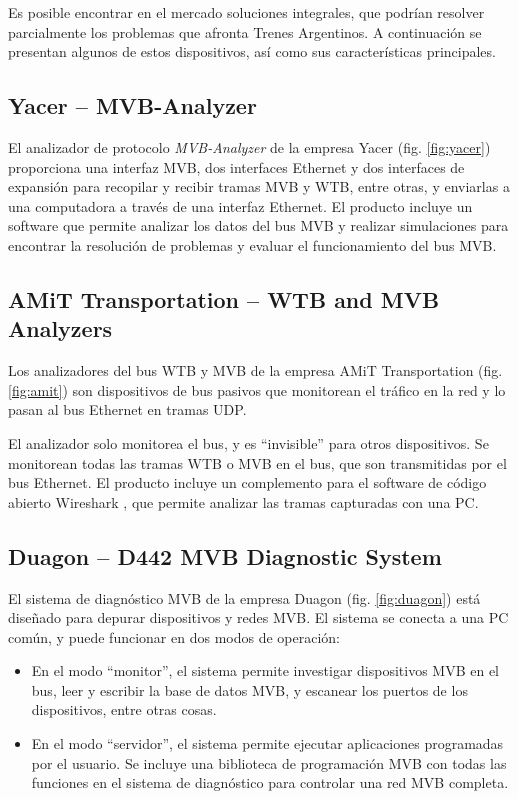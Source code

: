 Es posible encontrar en el mercado soluciones integrales, que podrían resolver parcialmente los problemas que afronta Trenes Argentinos. A continuación se presentan algunos de estos dispositivos, así como sus características principales.

\subsection{Yacer -- MVB-Analyzer}

El analizador de protocolo \textit{MVB-Analyzer} de la empresa Yacer \cite{yacer} (fig. \ref{fig:yacer}) proporciona una interfaz MVB, dos interfaces Ethernet y dos interfaces de expansión para recopilar y recibir tramas MVB y WTB, entre otras, y enviarlas a una computadora a través de una interfaz Ethernet. El producto incluye un software que permite analizar los datos del bus MVB y realizar simulaciones para encontrar la resolución de problemas y evaluar el funcionamiento del bus MVB.

\subsection{AMiT Transportation -- WTB and MVB Analyzers}

Los analizadores del bus WTB y MVB de la empresa AMiT Transportation \cite{amit} (fig. \ref{fig:amit}) son dispositivos de bus pasivos que monitorean el tráfico en la red y lo pasan al bus Ethernet en tramas UDP.

El analizador solo monitorea el bus, y es ``invisible'' para otros dispositivos. Se monitorean todas las tramas WTB o MVB en el bus, que son transmitidas por el bus Ethernet. El producto incluye un complemento para el software de código abierto Wireshark \cite{wireshark}, que permite analizar las tramas capturadas con una PC.

\subsection{Duagon -- D442 MVB Diagnostic System}

El sistema de diagnóstico MVB de la empresa Duagon \cite{duagon} (fig. \ref{fig:duagon}) está diseñado para depurar dispositivos y redes MVB. El sistema se conecta a una PC común, y puede funcionar en dos modos de operación:

\begin{itemize}
\item En el modo ``monitor'', el sistema permite investigar dispositivos MVB en el bus, leer y escribir la base de datos MVB, y escanear los puertos de los dispositivos, entre otras cosas.
\item En el modo ``servidor'', el sistema permite ejecutar aplicaciones programadas por el usuario. Se incluye una biblioteca de programación MVB con todas las funciones en el sistema de diagnóstico para controlar una red MVB completa.
\end{itemize}

